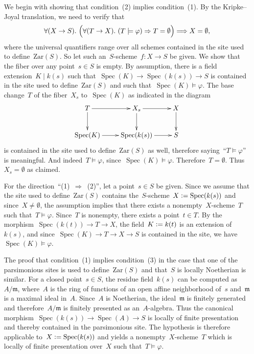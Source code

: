 \documentclass[10pt,reqno,a4paper]{amsbook}
\makeatletter
\theoremstyle{definition}
\theoremstyle{plain}
\theoremstyle{remark}
\newcommand{\mmm}{\mathfrak{m}}
\newcommand{\Zar}{\mathrm{Zar}}
\DeclareMathOperator{\Spec}{Spec}
\newcommand{\?}{\,{:}\,}
\renewcommand{\_}{\mathpunct{.}\,}
\newcommand{\fieldext}{\mathrel{|}}
\newcommand{\defeq}{\vcentcolon=}
\renewenvironment{proof}[1][\proofname]{\par
  \pushQED{\qed}%
  \normalfont \topsep6\p@\@plus6\p@\relax
  \trivlist
  \item[\hskip\labelsep
        \itshape
    #1\@addpunct{.}]\ignorespaces
}{%
  \popQED\endtrivlist\@endpefalse
}
\makeatother
\begin{document}
\begin{proof}We begin with showing that condition~(2) implies condition~(1). By
the Kripke--Joyal translation, we need to verify that
\[ \forall (X \to S)\_
  \Bigl(\forall (T \to X)\_ (T \models \varphi) \Rightarrow T = \emptyset\Bigr)
  \Longrightarrow X = \emptyset, \]
where the universal quantifiers range over all schemes contained in the site
used to define~$\Zar(S)$. So let such an~$S$-scheme~$f : X \to S$ be given. We
show that the fiber over any point~$s \in S$ is empty. By assumption, there is
a field extension~$K \fieldext k(s)$ such that~$\Spec(K) \to \Spec(k(s)) \to S$
is contained in the site used to define~$\Zar(S)$ and such that~$\Spec(K)
\models \varphi$. The base change~$T$ of the fiber~$X_s$ to~$\Spec(K)$ as
indicated in the diagram
\[ \xymatrix{
  T \ar[r]\ar[d] & X_s \ar[r]\ar[d] & X \ar[d] \\
  \Spec(K) \ar[r] & \Spec(k(s)) \ar[r] & S
} \]
is contained in the site used to define~$\Zar(S)$ as well, therefore
saying~``$T \models \varphi$'' is meaningful. And indeed~$T \models \varphi$,
since~$\Spec(K) \models \varphi$. Therefore~$T = \emptyset$. Thus~$X_s =
\emptyset$ as claimed.

For the direction~``(1)~$\Rightarrow$~(2)'', let a point~$s \in S$ be given.
Since we assume that the site used to define~$\Zar(S)$ contains
the~$S$-scheme~$X \defeq \Spec(k(s))$ and since~$X \neq \emptyset$, the
assumption implies that there exists a nonempty~$X$-scheme~$T$ such that~$T
\models \varphi$.  Since~$T$ is nonempty, there exists a point~$t \in T$. By
the morphism~$\Spec(k(t)) \to T \to X$, the field~$K \defeq k(t)$ is an
extension of~$k(s)$, and since~$\Spec(K) \to T \to X \to S$ is contained in the
site, we have~$\Spec(K) \models \varphi$.

The proof that condition~(1) implies condition~(3) in the case that one of the
parsimonious sites is used to define~$\Zar(S)$ and that~$S$ is locally
Noetherian is similar. For a closed point~$s \in S$, the residue field~$k(s)$
can be computed as~$A/\mmm$, where~$A$ is the ring of functions of an open
affine neighborhood of~$s$ and~$\mmm$ is a maximal ideal in~$A$. Since~$A$ is
Noetherian, the ideal~$\mmm$ is finitely generated and therefore~$A/\mmm$ is
finitely presented as an~$A$-algebra. Thus the canonical morphism~$\Spec(k(s))
\to \Spec(A) \to S$ is locally of finite presentation and thereby contained in
the parsimonious site. The hypothesis is therefore applicable to~$X \defeq
\Spec(k(s))$ and yields a nonempty~$X$-scheme~$T$ which is locally of finite
presentation over~$X$ such that~$T \models \varphi$.


\end{proof}
\end{document}
